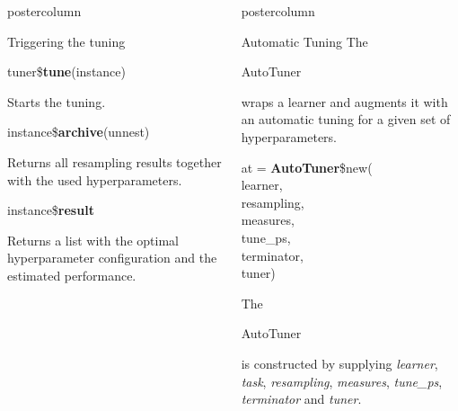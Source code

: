 \documentclass{beamer}
\newlength{\columnheight} %
\newcommand{\codeinline}[1]{\begin{codeboxinline}#1\end{codeboxinline}}
\begin{document}
\begin{frame}[fragile]{}
\begin{columns}
\begin{column}{.245\textwidth}
\begin{beamercolorbox}[center]{postercolumn}
\begin{minipage}{.98\textwidth}
{\begin{myblock}{Triggering the tuning}
							\\
							\begin{codebox}
								tuner\$\textbf{tune}(instance)
							\end{codebox}
							Starts the tuning.
							\\
							\begin{codebox}
								instance\$\textbf{archive}(unnest)
							\end{codebox}
							Returns all resampling results together with the used hyperparameters.
							\\
							\begin{codebox}
								instance\$\textbf{result}
							\end{codebox}
							Returns a list with the optimal hyperparameter configuration and the estimated performance.
						\end{myblock}
					\vfill}
				\end{minipage}
			\end{beamercolorbox}
		\end{column}
		\begin{column}{.245\textwidth}
			\begin{beamercolorbox}[center]{postercolumn}
				\begin{minipage}{.98\textwidth}
					\parbox[t][\columnheight]{\textwidth}{
						\begin{myblock}{Automatic Tuning}
						The \codeinline{AutoTuner} wraps a learner and augments it with an automatic tuning for a given set of hyperparameters. 
						\\
						\begin{codeboxmultiline}[width=18cm]
							at = \textbf{AutoTuner}\$new(
\\
							\hspace*{1ex}learner,
\\
							\hspace*{1ex}resampling,
\\
							\hspace*{1ex}measures,
\\
							\hspace*{1ex}tune\_ps,
\\
							\hspace*{1ex}terminator,
\\
							\hspace*{1ex}tuner)
						\end{codeboxmultiline}
						The \codeinline{AutoTuner} is constructed by supplying \textit{learner}, \textit{task},  \textit{resampling}, \textit{measures}, \textit{tune\_ps}, \textit{terminator} and \textit{tuner}. 

\end{myblock}}
\end{minipage}
\end{beamercolorbox}
\end{column}
\end{columns}
\end{frame}
\end{document}

